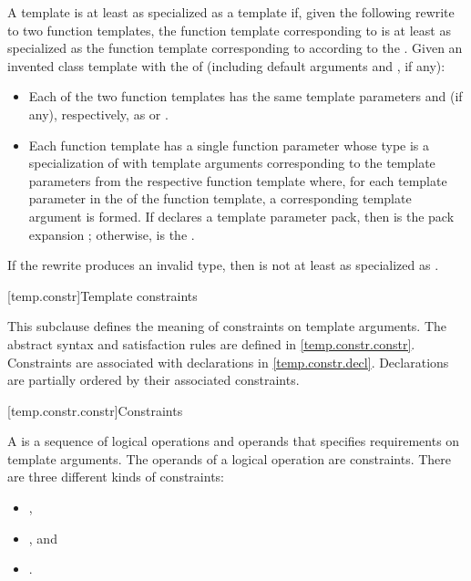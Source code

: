 \pnum
A template   is
at least as specialized as a template  
if, given the following rewrite to two function templates,
the function template corresponding to 
is at least as specialized as
the function template corresponding to 
according to the .
Given an invented class template 
with the  of  (including default arguments
and , if any):

\begin{itemize}
\item
Each of the two function templates has the same template parameters
and  (if any),
respectively, as  or .
\item
Each function template has a single function parameter
whose type is a specialization of 
with template arguments corresponding to the template parameters
from the respective function template where,
for each template parameter 
in the  of the function template,
a corresponding template argument  is formed.
If  declares a template parameter pack,
then  is the pack expansion ;
otherwise,  is the  .
\end{itemize}
If the rewrite produces an invalid type,
then  is not at least as specialized as .

[temp.constr]{Template constraints}

\pnum
\begin{note}
This subclause defines the meaning of constraints on template arguments.
The abstract syntax and satisfaction rules are defined
in \ref{temp.constr.constr}.
Constraints are associated with declarations in \ref{temp.constr.decl}.
Declarations are partially ordered by their associated constraints.
\end{note}

[temp.constr.constr]{Constraints}

%

\pnum
A  is a sequence of logical operations and
operands that specifies requirements on template arguments.
The operands of a logical operation are constraints.
There are three different kinds of constraints:
\begin{itemize}
\item {},
\item {}, and
\item {}.
\end{itemize}

